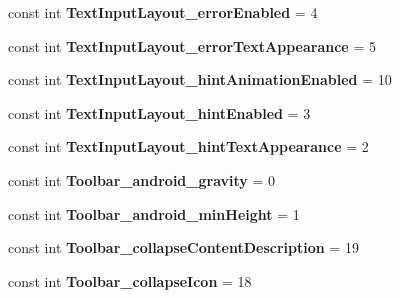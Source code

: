 \begin{DoxyCompactItemize}
const int {\bfseries Text\+Input\+Layout\+\_\+error\+Enabled} = 4
\item 
\mbox{\label{class_sample_app_1_1_droid_1_1_resource_1_1_styleable_aabf6cb71a63b41099f0c6018c30f4006}} 
const int {\bfseries Text\+Input\+Layout\+\_\+error\+Text\+Appearance} = 5
\item 
\mbox{\label{class_sample_app_1_1_droid_1_1_resource_1_1_styleable_a0af20858ef5e943aa40a0fd61e111cda}} 
const int {\bfseries Text\+Input\+Layout\+\_\+hint\+Animation\+Enabled} = 10
\item 
\mbox{\label{class_sample_app_1_1_droid_1_1_resource_1_1_styleable_a68630431ec9bfb701c1ed8f64a9071a2}} 
const int {\bfseries Text\+Input\+Layout\+\_\+hint\+Enabled} = 3
\item 
\mbox{\label{class_sample_app_1_1_droid_1_1_resource_1_1_styleable_a1f081c38dedae820a3dd9551f548a6f6}} 
const int {\bfseries Text\+Input\+Layout\+\_\+hint\+Text\+Appearance} = 2
\item 
\mbox{\label{class_sample_app_1_1_droid_1_1_resource_1_1_styleable_ac2061990626dfa305d6e51d6015962a6}} 
const int {\bfseries Toolbar\+\_\+android\+\_\+gravity} = 0
\item 
\mbox{\label{class_sample_app_1_1_droid_1_1_resource_1_1_styleable_a20857d899a622a69e42e9fec686487bf}} 
const int {\bfseries Toolbar\+\_\+android\+\_\+min\+Height} = 1
\item 
\mbox{\label{class_sample_app_1_1_droid_1_1_resource_1_1_styleable_a6cfefe2c4397a74d546b1058dff41ff8}} 
const int {\bfseries Toolbar\+\_\+collapse\+Content\+Description} = 19
\item 
\mbox{\label{class_sample_app_1_1_droid_1_1_resource_1_1_styleable_a2b1896404543450c0d8931d7af3ede8a}} 
const int {\bfseries Toolbar\+\_\+collapse\+Icon} = 18

\end{DoxyCompactItemize}
